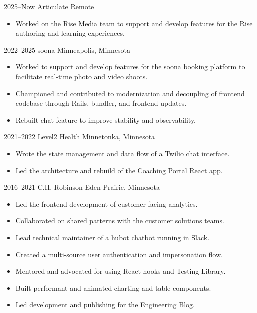 \documentclass[]{cv-style} %
\begin{document}
\begin{entrylist}


\entry
{2025--Now}
{Articulate}
{Remote}
{
\begin{itemize}
    \item[--] Worked on the Rise Media team to support and develop features for the Rise authoring and learning experiences.
\end{itemize}}

\entry
{2022--2025}
{soona}
{Minneapolis, Minnesota}
{
\begin{itemize}
    \item[--] Worked to support and develop features for the soona booking platform to facilitate real-time photo and video shoots.
    \item[--] Championed and contributed to modernization and decoupling of frontend codebase through Rails, bundler, and frontend updates.
    \item[--] Rebuilt chat feature to improve stability and observability.
\end{itemize}}

\entry
{2021--2022}
{Level2 Health}
{Minnetonka, Minnesota}
{
\begin{itemize}
    \item[--] Wrote the state management and data flow of a Twilio chat interface.
    \item[--] Led the architecture and rebuild of the Coaching Portal React app.
\end{itemize}}

\entry
{2016--2021}
{C.H. Robinson}
{Eden Prairie, Minnesota}
{

\begin{itemize}
    \item[--] Led the frontend development of customer facing analytics.
    \item[--] Collaborated on shared patterns with the customer solutions teams.
    \item[--] Lead technical maintainer of a hubot chatbot running in Slack.
\end{itemize}

\begin{itemize}
    \item[--] Created a multi-source user authentication and impersonation flow.
    \item[--] Mentored and advocated for using React hooks and Testing Library.
    \item[--] Built performant and animated charting and table components.
    \item[--] Led development and publishing for the Engineering Blog.
\end{itemize}

}
\end{entrylist}
\end{document}
